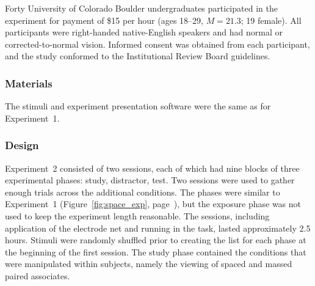 
Forty University of Colorado Boulder undergraduates participated in the experiment for payment of \$15 per hour (ages 18--29, $M=21.3$; 19 female).  All participants were right-handed native-English speakers and had normal or corrected-to-normal vision.  Informed consent was obtained from each participant, and the study conformed to the Institutional Review Board guidelines.

\subsubsection{Materials}

The stimuli and experiment presentation software were the same as for Experiment~1.

\subsubsection{Design}


Experiment~2 consisted of two sessions, each of which had nine blocks of three experimental phases: study, distractor, test.
\cbstart
Two sessions were used to gather enough trials across the additional conditions.
\cbend
The phases were similar to Experiment~1 (Figure~\ref{fig:space_exp}, page~\pageref{fig:space_exp}), but the exposure phase was not used to keep the experiment length reasonable.
The sessions, including application of the electrode net and running in the task, lasted approximately 2.5 hours.  Stimuli were randomly shuffled prior to creating the list for each phase at the beginning of the first session.  The study phase contained the conditions that were manipulated within subjects, namely the viewing of spaced and massed paired associates.

